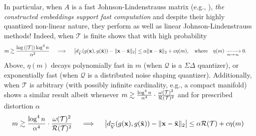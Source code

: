 In particular, when $A$ is a fast Johnson-Lindenstrauss matrix (e.g., \cite{ailon2009fast}), \emph{the constructed embeddings support fast computation} and despite their highly quantized non-linear nature, they perform as well as linear Johnson-Lindenstrauss methods!
{Indeed, when $\mathcal{T}$ is finite} \cite{huynh2018fast} shows that with high probability
\begin{align*} m \gtrsim \frac{\log{(|\mathcal{T}|)} \log^4 n}{\alpha^2} \quad \implies  \quad \big|d_{\widetilde{V}}(g(\mathbf{x}), g(\tilde{\mathbf{x}})) - \|\mathbf{x} - \tilde{\mathbf{x}}\|_2\big| & \leq {\alpha}\|\mathbf{x} - \tilde{\mathbf{x}}\|_2 + c\eta(m),  \quad\text{where} \quad \eta(m) \xrightarrow[m \rightarrow \infty]{} 0. \end{align*}
Above, $\eta(m)$ decays polynomially fast in $m$ (when $\mathcal{Q}$ is a $\Sigma\Delta$ quantizer), or exponentially fast (when $\mathcal{Q}$ is a distributed noise shaping quantizer). %
{Additionally, when $\mathcal{T}$ is arbitrary (with possibly infinite cardinality, e.g., a compact manifold)} \cite{huynh2018fast} shows a similar result albeit whenever $m \gtrsim \frac{\log^4 n}{\alpha^4}\cdot\frac{\omega(\mathcal{T})^2}{\mathcal{R}(\mathcal{T})^2}$
%
\iffalse and for prescribed distortion $\alpha$
\[ m \gtrsim \frac{\log^4 n}{\alpha^4}\cdot\frac{\omega(\mathcal{T})^2}{\mathcal{R}(\mathcal{T})^2} \quad \implies \quad \big|d_{\widetilde{V}}(g(\mathbf{x}), g(\tilde{\mathbf{x}})) - \|\mathbf{x} - \tilde{\mathbf{x}}\|_2\big| \leq \alpha \mathcal{R}(\mathcal{T}) + c\eta(m)\]

